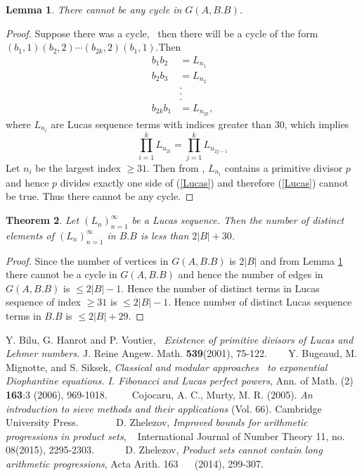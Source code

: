 \documentclass{amsart}
\newtheorem{Lemma 1}{Lemma}[section]
\newtheorem{Lemma 3}[Lemma 1]{Lemma}
\newtheorem{Lucas The}[Lemma 1]{Theorem}
\newtheorem{lem 1}[Lemma 1]{Lemma}
\newtheorem{Corollary 1}[Lemma 1]{Corollary}
\newtheorem{Corollary 2}[Lemma 1]{Corollary}
\begin{document}
	\begin{Lemma 3}\label{Lemma 3}There cannot be any cycle in $G(A,B.B)$.\end{Lemma 3}\begin{proof}Suppose there was a cycle,  then there will be a cycle of the form $(b_1,1)(b_2,2)\cdots (b_{2k},2)(b_1,1)$.Then \begin{align*}  b_1b_2&=L_{n_1}\\  b_2b_3&=L_{n_2}\\        &.       \\        &.\\        &.\\  b_{2k}b_1&=L_{n_{2k}},      \end{align*}where $L_{n_i}$ are Lucas sequence terms with indices greater than $30$, which implies\begin{equation}\label{Lucas}\prod_{i=1}^{k}L_{n_{2i}}=\prod_{j=1}^{k}L_{n_{2j-1}}\end{equation}Let $n_i$ be the largest index $\geq 31$. Then from \cite{D}, $L_{n_i}$ contains a primitive divisor $p$ and hence $p$ divides exactly one side of (\ref{Lucas}) and therefore (\ref{Lucas}) cannot be true. Thus there cannot be any cycle.\end{proof}
	\begin{Lucas The}Let $(L_n)_{n=1}^\infty$ be a Lucas sequence. Then the number of distinct elements of $(L_n)_{n=1}^\infty$ in $B.B$ is less than $2|B|+30$.\end{Lucas The}\begin{proof}Since the number of vertices in $G(A,B.B)$ is $2|B|$ and from Lemma \ref{Lemma 3} there cannot be a cycle in $G(A,B.B)$ and hence the number of edges in $G(A,B.B)$ is $\leq 2|B|-1$. Hence the number of distinct terms in Lucas sequence of index $\geq 31$ is $\leq 2|B|-1$. Hence number of distinct Lucas sequence terms in $B.B$ is $\leq 2|B|+29$.\end{proof}
	
	
	
	\begin{thebibliography}{10}
		
		Y. Bilu, G. Hanrot and P. Voutier, {\it  Existence of primitive divisors of Lucas and Lehmer numbers.} J. Reine Angew. Math. {\bf 539}(2001), 75-122.
		    
	   Y. Bugeaud, M. Mignotte, and S. Siksek, {\it Classical and modular approaches  to exponential Diophantine equations. I. Fibonacci and Lucas perfect powers}, Ann. of Math. (2)  {\bf 163}:3 (2006), 969-1018.
	        
	    Cojocaru, A. C., Murty, M. R. (2005). {\it An introduction to sieve methods and their applications} (Vol. 66). Cambridge University Press.
	          
	    D. Zhelezov, {\it Improved bounds for arithmetic progressions in product sets},   International Journal of Number Theory 11, no. 08(2015), 2295-2303.
	        
	     D. Zhelezov, {\it Product sets cannot contain long arithmetic progressions}, Acta Arith. 163    (2014), 299-307.         
   \end{thebibliography}
\end{document}

